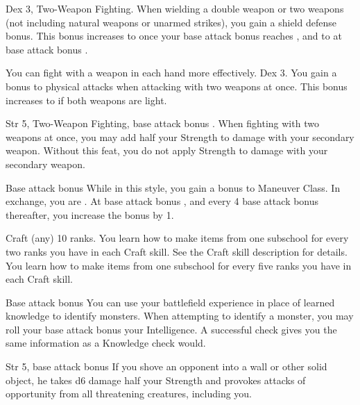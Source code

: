  Dex 3, Two-Weapon Fighting.
 When wielding a double weapon or two weapons (not including natural weapons or unarmed strikes), you gain a  shield defense bonus. This bonus increases to  once your base attack bonus reaches , and to  at base attack bonus .

You can fight with a weapon in each hand more effectively.
 Dex 3.
 You gain a  bonus to physical attacks when attacking with two weapons at once. This bonus increases to  if both weapons are light.

 Str 5, Two-Weapon Fighting, base attack bonus .
 When fighting with two weapons at once, you may add half your Strength to damage with your secondary weapon.
 Without this feat, you do not apply Strength to damage with your secondary weapon.

 Base attack bonus 
 While in this style, you gain a  bonus to Maneuver Class. In exchange, you are \immobilized. At base attack bonus , and every 4 base attack bonus thereafter, you increase the bonus by 1.

 Craft (any) 10 ranks.
 You learn how to make items from one subschool for every two ranks you have in each Craft skill. See the Craft skill description for details.
 You learn how to make items from one subschool for every five ranks you have in each Craft skill.

\featpre Base attack bonus 
\featben You can use your battlefield experience in place of learned knowledge to identify monsters. When attempting to identify a monster, you may roll your base attack bonus \add your Intelligence. A successful check gives you the same information as a Knowledge check would.

\featpre Str 5, base attack bonus 
\featben If you shove an opponent into a wall or other solid object, he takes d6 damage \add half your Strength and provokes attacks of opportunity from all threatening creatures, including you.

